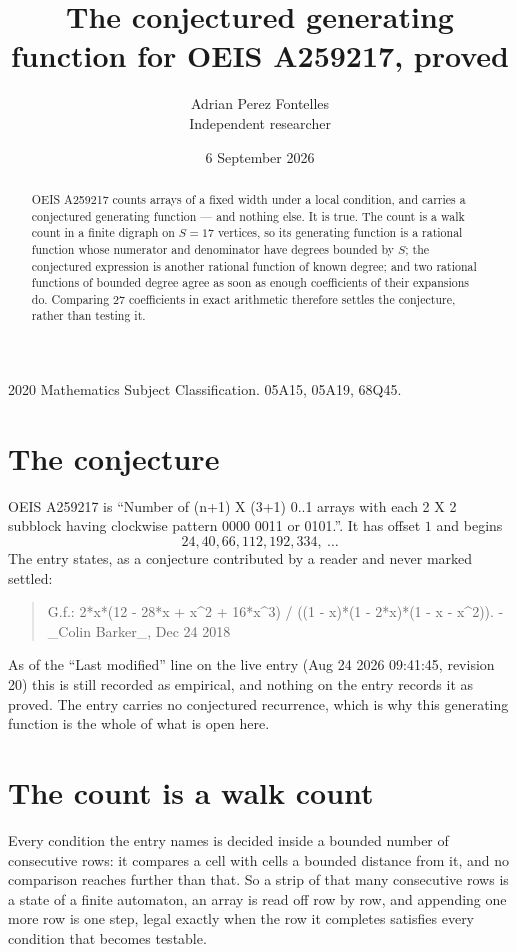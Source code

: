 \documentclass[11pt,a4paper]{article}
\title{The conjectured generating function for OEIS A259217, proved}
\author{Adrian Perez Fontelles\\ \small Independent researcher}
\date{6 September 2026}
\theoremstyle{plain}
\theoremstyle{definition}
\begin{document}
\maketitle

\begin{abstract}
OEIS A259217 counts arrays of a fixed width under a local condition, and carries a conjectured
generating function --- and nothing else. It is true. The count is a walk count in a finite
digraph on $S=17$ vertices, so its generating function is a rational function whose numerator
and denominator have degrees bounded by $S$; the conjectured expression is another rational
function of known degree; and two rational functions of bounded degree agree as soon as enough
coefficients of their expansions do. Comparing $27$ coefficients in exact arithmetic
therefore settles the conjecture, rather than testing it.
\end{abstract}

\noindent\small 2020 Mathematics Subject Classification. 05A15, 05A19, 68Q45.\normalsize

\section{The conjecture}

OEIS A259217 is ``Number of (n+1) X (3+1) 0..1 arrays with each 2 X 2 subblock having clockwise pattern 0000 0011 or 0101.''. It has offset $1$ and begins
\[
24, 40, 66, 112, 192, 334,\ \dots
\]
The entry states, as a conjecture contributed by a reader and never marked settled:
\begin{quote}
G.f.: 2*x*(12 - 28*x + x\^{}2 + 16*x\^{}3) / ((1 - x)*(1 - 2*x)*(1 - x - x\^{}2)). - \_Colin Barker\_, Dec 24 2018
\end{quote}
As of the ``Last modified'' line on the live entry (Aug 24 2026 09:41:45, revision 20) this is still
recorded as empirical, and nothing on the entry records it as proved. The entry carries no
conjectured recurrence, which is why this generating function is the whole of what is open
here.

\section{The count is a walk count}

Every condition the entry names is decided inside a bounded number of consecutive rows: it
compares a cell with cells a bounded distance from it, and no comparison reaches further than
that. So a strip of that many consecutive rows is a state of a finite automaton, an array is
read off row by row, and appending one more row is one step, legal exactly when the row it
completes satisfies every condition that becomes testable.
\end{document}
